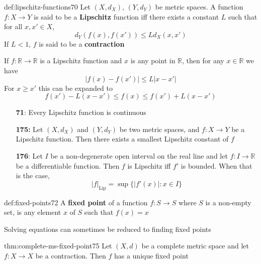 \documentclass[landscape, 8pt]{extarticle}
\begin{document}
\begin{multicols}{3}
\vspace{-5pt}
\begin{dfn}{def:lipschitz-functions}{70}
    Let $(X, d_{X}),\,(Y, d_{Y})$ be metric spaces. A function $f : X \to Y$ is said to be a \textbf{Lipschitz} function iff there exists a constant $L$ such that for all $x,x'\in X$,
    \[d_{Y}(f(x), f(x')) \le L d_{X}(x,x')\]
    If $L < 1$, $f$ is said to be a \textbf{contraction}

    If $f : \mathbb{R} \to \mathbb{R}$ is a Lipschitz function and $x$ is any point in $\mathbb{R}$, then for any $x\in \mathbb{R}$ we have
    \[\lvert f(x) - f(x') \rvert \le L\lvert x - x' \rvert\]
    For $x \ge x'$ this can be expanded to
    \[f(x') - L(x - x') \le f(x) \le f(x') + L(x - x')\]


    \vspace{-8pt}
    \begin{itemize}
        \item[\textbf{71}:] Every Lipschitz function is continuous
        \item[\textbf{175:}] Let $(X, d_{X})$ and $(Y, d_{Y})$ be two metric spaces, and $f : X \to Y$ be a Lipschitz function. Then there exists a smallest Lipschitz constant of $f$ 
        \item[\textbf{176}:] Let $I$ be a non-degenerate open interval on the real line and let $f : I \to \mathbb{R}$ be a differentiable function. Then $f$ is Lipschitz iff $f'$ is bounded. When that is the case,
            \[\lvert f \rvert_{\text{Lip}} = \sup \{\lvert f'(x) \rvert : x\in I\}\]
    \end{itemize}

\end{dfn}

\begin{dfn}{def:fixed-points}{72}
    \vspace{-5pt}
    A \textbf{fixed point} of a function $f: S \to S $ where $S$ is a non-empty set, is any element $x$ of $S$ such that $f(x) = x$

    Solving equations can sometimes be reduced to finding fixed points
\end{dfn}

\begin{thm}{thm:complete-ms-fixed-point}{75}
    \vspace{-5pt}
    Let $(X, d)$ be a complete metric space and let $f : X \to X$ be a contraction. Then $f$ has a unique fixed point
\end{thm}



\end{multicols}
\end{document}
